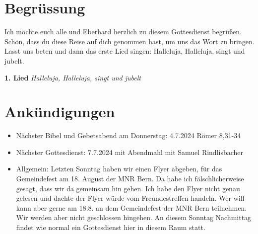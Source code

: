 
\section{Begrüssung}
Ich möchte euch alle und Eberhard herzlich zu diesem Gottesdienst begrüßen. Schön, dass du diese Reise auf dich genommen hast, um uns das Wort zu bringen. \\Lasst uns beten und dann das erste Lied singen: Halleluja, Halleluja, singt und jubelt.

\textbf{1. Lied}
\textit{Halleluja, Halleluja, singt und jubelt}

\section{Ankündigungen}
\begin{itemize}
    \item Nächster Bibel und Gebetsabend am Donnerstag: 4.7.2024 Römer 8,31-34
    \item Nächster Gottesdienst: 7.7.2024 mit Abendmahl mit Samuel Rindlisbacher
    \item Allgemein: Letzten Sonntag haben wir einen Flyer abgeben, für das Gemeindefest am 18. August der MNR Bern. Da habe ich fälschlicherweise gesagt, dass wir da gemeinsam hin gehen. Ich habe den Flyer nicht genau gelesen und dachte der Flyer würde vom Freundestreffen handeln. Wer will kann aber gerne am 18.8. an dem Gemeindefest der MNR Bern teilnehmen. Wir werden aber nicht geschlossen hingehen. An diesem Sonntag Nachmittag findet wie normal ein Gottesdienst hier in diesem Raum statt.
\end{itemize}

